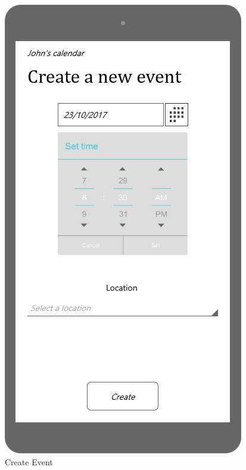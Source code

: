 \documentclass{article}
\begin{document}
\begin{figure}[H]
  \includegraphics[width=\linewidth]{02-Create_an_event.png}
  \caption{Create Event}\label{fig:MU5}
\endminipage\hfill
{}

\end{figure}
\end{document}
